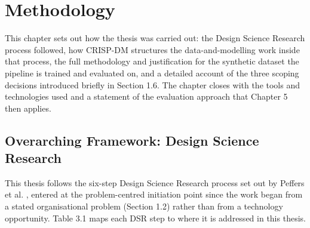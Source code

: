 \documentclass[12pt,oneside]{report}
\begin{document}
\hypertarget{methodology}{%
\chapter{Methodology}\label{methodology}}

This chapter sets out how the thesis was carried out: the Design Science
Research process followed, how CRISP-DM structures the
data-and-modelling work inside that process, the full methodology and
justification for the synthetic dataset the pipeline is trained and
evaluated on, and a detailed account of the three scoping decisions
introduced briefly in Section 1.6. The chapter closes with the tools and
technologies used and a statement of the evaluation approach that
Chapter 5 then applies.

\hypertarget{overarching-framework-design-science-research}{%
\section{Overarching Framework: Design Science
Research}\label{overarching-framework-design-science-research}}

This thesis follows the six-step Design Science Research process set out
by Peffers et al. \citep{peffers2007design}, entered at the
problem-centred initiation point since the work began from a stated
organisational problem (Section 1.2) rather than from a technology
opportunity. Table 3.1 maps each DSR step to where it is addressed in
this thesis.
\end{document}
